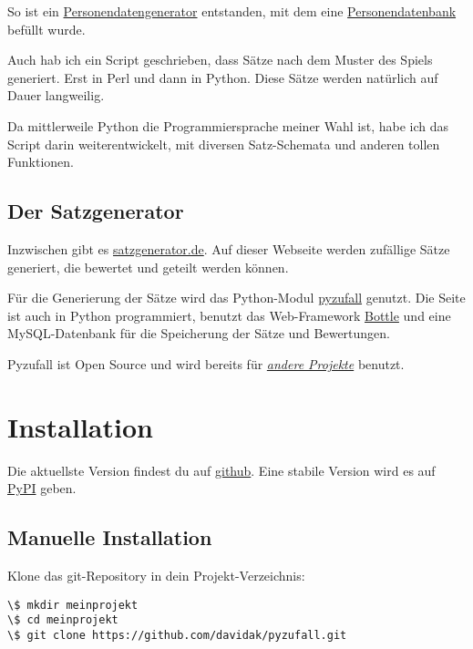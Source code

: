 \documentclass[a4paper,12pt,oneside]{sphinxmanual}
\begin{document}
So ist ein \href{http://davidak.de/wiki/perl/personendatengenerator}{Personendatengenerator} entstanden, mit dem eine \href{http://davidak.de/personen/}{Personendatenbank} befüllt wurde.

Auch hab ich ein Script geschrieben, dass Sätze nach dem Muster des Spiels generiert. Erst in Perl und dann in Python. Diese Sätze werden natürlich auf Dauer langweilig.

Da mittlerweile Python die Programmiersprache meiner Wahl ist, habe ich das Script darin weiterentwickelt, mit diversen Satz-Schemata und anderen tollen Funktionen.


\section{Der Satzgenerator}
\label{entstehung:der-satzgenerator}
Inzwischen gibt es \href{http://satzgenerator.de/}{satzgenerator.de}. Auf dieser Webseite werden zufällige Sätze generiert, die bewertet und geteilt werden können.

Für die Generierung der Sätze wird das Python-Modul \href{https://github.com/davidak/pyzufall}{pyzufall} genutzt. Die Seite ist auch in Python programmiert, benutzt das Web-Framework \href{http://bottlepy.org/}{Bottle} und eine MySQL-Datenbank für die Speicherung der Sätze und Bewertungen.

Pyzufall ist Open Source und wird bereits für {\hyperref[benutzer::doc]{\emph{andere Projekte}}} benutzt.


\chapter{Installation}
\label{installation:installation}\label{installation::doc}
Die aktuellste Version findest du auf \href{https://github.com/davidak/pyzufall}{github}. Eine stabile Version wird es auf \href{https://pypi.python.org/}{PyPI} geben.


\section{Manuelle Installation}
\label{installation:manuelle-installation}
Klone das git-Repository in dein Projekt-Verzeichnis:

\begin{Verbatim}[commandchars=\\\{\}]
\$ mkdir meinprojekt
\$ cd meinprojekt
\$ git clone https://github.com/davidak/pyzufall.git
\end{Verbatim}
\end{document}
